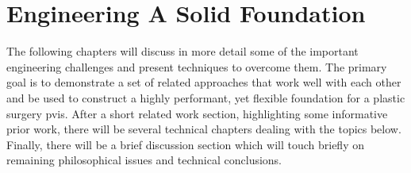   \section{Engineering A Solid Foundation}

  The following chapters will discuss in more detail some of the
  important engineering challenges and present techniques to overcome
  them. The primary goal is to demonstrate a set of related approaches
  that work well with each other and be used to construct a highly
  performant, yet flexible foundation for a plastic surgery
  \gls{pvis}. After a short related work section, highlighting some
  informative prior work, there will be several technical chapters
  dealing with the topics below. Finally, there will be a brief
  discussion section which will touch briefly on remaining
  philosophical issues and technical conclusions.

